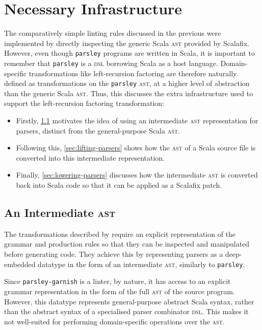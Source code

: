 \documentclass[../../main.tex]{subfiles}
\begin{document}
\section{Necessary Infrastructure}\label{sec:leftrec-infra}
The comparatively simple linting rules discussed in the previous  were implemented by directly inspecting the generic Scala \textsc{ast} provided by Scalafix.
However, even though \texttt{parsley} programs are written in Scala, it is important to remember that \texttt{parsley} is a \textsc{dsl} borrowing Scala as a host language.
Domain-specific transformations like left-recursion factoring are therefore naturally defined as transformations on the \texttt{parsley} \textsc{ast}, at a higher level of abstraction than the generic Scala \textsc{ast}.
Thus, this  discusses the extra infrastructure used to support the left-recursion factoring transformation:
\begin{itemize}
  \item Firstly, \cref{sec:parser-ast-motivation} motivates the idea of using an intermediate \textsc{ast} representation for parsers, distinct from the general-purpose Scala \textsc{ast}.
  \item Following this, \cref{sec:lifting-parsers} shows how the \textsc{ast} of a Scala source file is converted into this intermediate representation.
  \item Finally, \cref{sec:lowering-parsers} discusses how the intermediate \textsc{ast} is converted back into Scala code so that it can be applied as a Scalafix patch.
\end{itemize}

\subsection{An Intermediate \textsc{ast}}\label{sec:parser-ast-motivation}
The transformations described by \textcite{baars_leftrec_2004} require an explicit representation of the grammar and production rules so that they can be inspected and manipulated before generating code.
They achieve this by representing parsers as a deep-embedded datatype in the form of an intermediate \textsc{ast}, similarly to \texttt{parsley}.

Since \texttt{parsley-garnish} is a linter, by nature, it has access to an explicit grammar representation in the form of the full  \textsc{ast} of the source program.
However, this datatype represents general-purpose abstract Scala syntax, rather than the abstract syntax of a specialised parser combinator \textsc{dsl}.
This makes it not well-suited for performing domain-specific operations over the \textsc{ast}.
\end{document}
